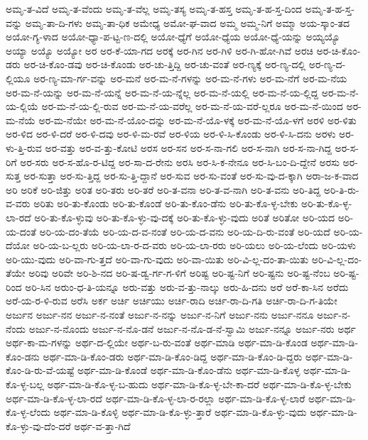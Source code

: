 {ಅಮೃ-ತ-ವಿದೆ
ಅಮೃ-ತ-ವೆಂದು
ಅಮೃ-ತ-ವೆಲ್ಲ
ಅಮೃ-ತಸ್ಯ
ಅಮೃ-ತ-ಹಸ್ತ
ಅಮೃ-ತ-ಹ-ಸ್ತ-ದಿಂದ
ಅಮೃ-ತ-ಹ-ಸ್ತ-ವನ್ನು
ಅಮೃ-ತಾ-ದಿ-ಗಳು
ಅಮೃ-ತಾ-ಧಿಕ
ಅಮೇಧ್ಯ
ಅಮೋ-ಘ-ವಾದ
ಅಮ್ಮ
ಅಮ್ಮ-ನಿಗೆ
ಅಮ್ಮಾ
ಅಯ-ಸ್ಕಾಂ-ತದ
ಅಯೋ-ಗ್ಯ-ಳಾದ
ಅಯೋ-ಧ್ಯಾ-ಪ-ಟ್ಟ-ಣ-ದಲ್ಲಿ
ಅಯೋ-ಧ್ಯೆಗೆ
ಅಯೋ-ಧ್ಯೆಯ
ಅಯೋ-ಧ್ಯೆ-ಯನ್ನು
ಅಯ್ಯಯ್ಯೊ
ಅಯ್ಯಾ
ಅಯ್ಯೊ
ಅಯ್ಯೋ
ಅರ
ಅರ-ಕೆ-ಯಾ-ಗದ
ಅರಕ್ಕೆ
ಅರ-ಗಿನ
ಅರ-ಗಿಳಿ
ಅರ-ಗಿ-ಹೋ-ಗಿವೆ
ಅರಚಿ
ಅರ-ಚಿ-ಕೊಂ-ಡರು
ಅರ-ಚಿ-ಕೊಂ-ಡವು
ಅರ-ಚಿ-ಕೊಂಡು
ಅರ-ಚು-ತ್ತಿದ್ದಿ
ಅರ-ಚು-ವಂತೆ
ಅರ-ಣ್ಯಕ್ಕೆ
ಅರ-ಣ್ಯ-ದಲ್ಲಿ
ಅರ-ಣ್ಯ-ದ-ಲ್ಲಿಯೂ
ಅರ-ಣ್ಯ-ಮಾ-ರ್ಗ-ವನ್ನು
ಅರ-ಮನೆ
ಅರ-ಮ-ನೆ-ಗಳನ್ನು
ಅರ-ಮ-ನೆ-ಗಳು
ಅರ-ಮ-ನೆಗೆ
ಅರ-ಮ-ನೆಯ
ಅರ-ಮ-ನೆ-ಯನ್ನು
ಅರ-ಮ-ನೆ-ಯನ್ನೆ
ಅರ-ಮ-ನೆ-ಯ-ನ್ನೆಲ್ಲ
ಅರ-ಮ-ನೆ-ಯಲ್ಲಿ
ಅರ-ಮ-ನೆ-ಯ-ಲ್ಲಿದ್ದ
ಅರ-ಮ-ನೆ-ಯ-ಲ್ಲಿಯೆ
ಅರ-ಮ-ನೆ-ಯ-ಲ್ಲಿ-ರುವ
ಅರ-ಮ-ನೆ-ಯ-ವರೆಲ್ಲ
ಅರ-ಮ-ನೆ-ಯ-ವರೆ-ಲ್ಲರೂ
ಅರ-ಮ-ನೆ-ಯಿಂದ
ಅರ-ಮ-ನೆಯೆ
ಅರ-ಮ-ನೆಯೇ
ಅರ-ಮ-ನೆ-ಯೊಂ-ದನ್ನು
ಅರ-ಮ-ನೆ-ಯೊ-ಳಕ್ಕೆ
ಅರ-ಮ-ನೆ-ಯೊ-ಳಗೆ
ಅರಳಿ
ಅರ-ಳಿತು
ಅರ-ಳಿದ
ಅರ-ಳಿ-ದರೆ
ಅರ-ಳಿ-ದವು
ಅರ-ಳಿ-ಮ-ರವೆ
ಅರ-ಳಿಯ
ಅರ-ಳಿ-ಸಿ-ಕೊಂಡು
ಅರ-ಳಿ-ಸಿ-ದನು
ಅರಳು
ಅರ-ಳು-ತ್ತಿ-ರುವ
ಅರ-ವತ್ತು
ಅರ-ವ-ತ್ತು-ಕೋಟಿ
ಅರಸ
ಅರ-ಸನ
ಅರ-ಸ-ನಾ-ಗಲಿ
ಅರ-ಸ-ನಾಗಿ
ಅರ-ಸ-ನಾ-ಗಿದ್ದ
ಅರ-ಸ-ರಿಗೆ
ಅರ-ಸರು
ಅರ-ಸ-ಹೊ-ರ-ಟಿದ್ದ
ಅರ-ಸಾ-ದ-ರೇನು
ಅರಸಿ
ಅರ-ಸಿ-ಕ-ನೇನೂ
ಅರ-ಸಿ-ಬಂ-ದಿ-ದ್ದೇನೆ
ಅರಸು
ಅರ-ಸುತ್ತ
ಅರ-ಸುತ್ತಾ
ಅರ-ಸು-ತ್ತಿದ್ದ
ಅರ-ಸು-ತ್ತಿ-ದ್ದಾನೆ
ಅರ-ಸುವ
ಅರ-ಸು-ವಂತೆ
ಅರ-ಸು-ವು-ದ-ಕ್ಕಾಗಿ
ಅರಾ-ಜ-ಕ-ವಾದ
ಅರಿ
ಅರಿಕೆ
ಅರಿ-ಜಿತ್ತು
ಅರಿತ
ಅರಿ-ತರು
ಅರಿ-ತರೆ
ಅರಿ-ತ-ವನಾ
ಅರಿ-ತ-ವ-ನಾಗಿ
ಅರಿ-ತ-ವನು
ಅರಿ-ತಿದ್ದ
ಅರಿ-ತಿ-ರು-ವ-ವರು
ಅರಿತು
ಅರಿ-ತು-ಕೊಂಡು
ಅರಿ-ತು-ಕೊಂಡೆ
ಅರಿ-ತು-ಕೊಂ-ಡೆನು
ಅರಿ-ತು-ಕೊ-ಳ್ಳ-ಬೇಕು
ಅರಿ-ತು-ಕೊ-ಳ್ಳ-ಲಾ-ರದೆ
ಅರಿ-ತು-ಕೊ-ಳ್ಳುವು
ಅರಿ-ತು-ಕೊ-ಳ್ಳು-ವು-ದಕ್ಕೆ
ಅರಿ-ತು-ಕೊ-ಳ್ಳು-ವುದು
ಅರಿತೆ
ಅರಿತೋ
ಅರಿ-ಯದ
ಅರಿ-ಯ-ದಂತೆ
ಅರಿ-ಯ-ದಂ-ತೆಯೆ
ಅರಿ-ಯ-ದ-ವ-ನಂತೆ
ಅರಿ-ಯ-ದ-ವನು
ಅರಿ-ಯ-ದಿ-ರು-ವಂತೆ
ಅರಿ-ಯದೆ
ಅರಿ-ಯ-ದೆಯೋ
ಅರಿ-ಯ-ಬ-ಲ್ಲರು
ಅರಿ-ಯ-ಲಾ-ರ-ದ-ವರು
ಅರಿ-ಯ-ಲಾ-ರರು
ಅರಿ-ಯಲು
ಅರಿ-ಯ-ಲೆಂದು
ಅರಿ-ಯಳು
ಅರಿ-ಯು-ವುದು
ಅರಿ-ವಾ-ಗು-ತ್ತದೆ
ಅರಿ-ವಾ-ಗು-ವುದು
ಅರಿ-ವಾ-ಯಿತು
ಅರಿ-ವಿ-ಲ್ಲ-ದಂ-ತಾ-ಯಿತು
ಅರಿ-ವಿ-ಲ್ಲ-ದಂ-ತೆಯೇ
ಅರಿವು
ಅರಿವೇ
ಅರಿ-ಶಿ-ನದ
ಅರಿ-ಷ-ಡ್ವ-ರ್ಗ-ಗ-ಳಿಗೆ
ಅರಿಷ್ಟ
ಅರಿ-ಷ್ಟ-ನಿಗೆ
ಅರಿ-ಷ್ಟನು
ಅರಿ-ಷ್ಟ-ನೆಂಬ
ಅರಿ-ಷ್ಟ-ರಿಂದ
ಅರಿ-ಸಿನ
ಅರುಂ-ಧ-ತಿ-ಯನ್ನೂ
ಅರು-ವತ್ತು
ಅರು-ವ-ತ್ತು-ನಾಲ್ಕು
ಅರು-ಹಿ-ದನು
ಅರೆ
ಅರೆ-ಕಾ-ಸಿನ
ಅರೆದು
ಅರೆ-ಯ-ರ-ಳಿ-ರುವ
ಅರೆಸಿ
ಅರ್ಕ
ಅರ್ಚಿ
ಅರ್ಚಿಯು
ಅರ್ಚಿ-ರಾದಿ
ಅರ್ಚಿ-ರಾ-ದಿ-ಗತಿ
ಅರ್ಚಿ-ರಾ-ದಿ-ಗ-ತಿಯೇ
ಅರ್ಜುನ
ಅರ್ಜು-ನನ
ಅರ್ಜು-ನ-ನಂತೆ
ಅರ್ಜು-ನ-ನನ್ನು
ಅರ್ಜು-ನ-ನಿಗೆ
ಅರ್ಜು-ನನು
ಅರ್ಜು-ನನೂ
ಅರ್ಜು-ನ-ನೆಂದು
ಅರ್ಜು-ನ-ನೊಂದು
ಅರ್ಜು-ನ-ನೊ-ಡನೆ
ಅರ್ಜು-ನ-ನೊ-ಡ-ನೆ-ಸ್ವಾಮಿ
ಅರ್ಜು-ನನ್ನೂ
ಅರ್ಜು-ನರು
ಅರ್ಥ
ಅರ್ಥ-ಕಾ-ಮ-ಗಳನ್ನು
ಅರ್ಥ-ದ-ಲ್ಲಿಯೇ
ಅರ್ಥ-ಬ-ರು-ವಂತೆ
ಅರ್ಥ-ಮಾಡಿ
ಅರ್ಥ-ಮಾ-ಡಿ-ಕೊಂಡ
ಅರ್ಥ-ಮಾ-ಡಿ-ಕೊಂ-ಡನು
ಅರ್ಥ-ಮಾ-ಡಿ-ಕೊಂ-ಡರು
ಅರ್ಥ-ಮಾ-ಡಿ-ಕೊಂ-ಡಿದ್ದ
ಅರ್ಥ-ಮಾ-ಡಿ-ಕೊಂ-ಡಿ-ದ್ದರು
ಅರ್ಥ-ಮಾ-ಡಿ-ಕೊಂ-ಡಿ-ರು-ವೆ-ಯಷ್ಟೆ
ಅರ್ಥ-ಮಾ-ಡಿ-ಕೊಂಡೆ
ಅರ್ಥ-ಮಾ-ಡಿ-ಕೊಂ-ಡೆನು
ಅರ್ಥ-ಮಾ-ಡಿ-ಕೊಳ್ಳ
ಅರ್ಥ-ಮಾ-ಡಿ-ಕೊ-ಳ್ಳ-ಬಲ್ಲ
ಅರ್ಥ-ಮಾ-ಡಿ-ಕೊ-ಳ್ಳ-ಬ-ಹುದು
ಅರ್ಥ-ಮಾ-ಡಿ-ಕೊ-ಳ್ಳ-ಬೇ-ಕಾ-ದರೆ
ಅರ್ಥ-ಮಾ-ಡಿ-ಕೊ-ಳ್ಳ-ಬೇಕು
ಅರ್ಥ-ಮಾ-ಡಿ-ಕೊ-ಳ್ಳ-ಲಾ-ರದೆ
ಅರ್ಥ-ಮಾ-ಡಿ-ಕೊ-ಳ್ಳ-ಲಾ-ರ-ರಲ್ಲಾ
ಅರ್ಥ-ಮಾ-ಡಿ-ಕೊ-ಳ್ಳ-ಲಾರೆ
ಅರ್ಥ-ಮಾ-ಡಿ-ಕೊ-ಳ್ಳ-ಲೆಂದು
ಅರ್ಥ-ಮಾ-ಡಿ-ಕೊಳ್ಳಿ
ಅರ್ಥ-ಮಾ-ಡಿ-ಕೊ-ಳ್ಳು-ತ್ತಾರೆ
ಅರ್ಥ-ಮಾ-ಡಿ-ಕೊ-ಳ್ಳು-ವುದು
ಅರ್ಥ-ಮಾ-ಡಿ-ಕೊ-ಳ್ಳು-ವು-ದೆಂ-ದರೆ
ಅರ್ಥ-ವ-ತ್ತಾ-ಗಿದೆ
}
